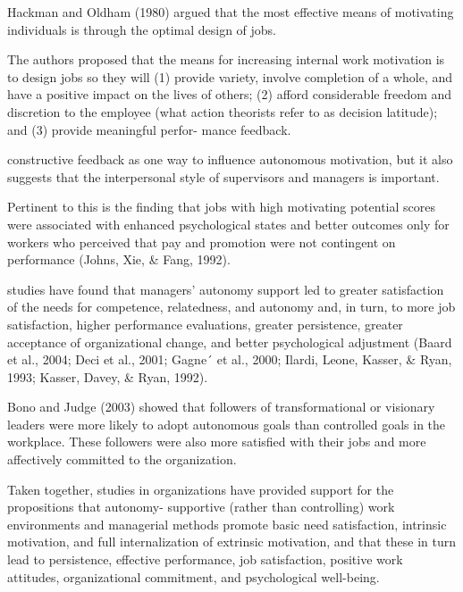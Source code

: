 Hackman and Oldham (1980) argued that the most effective means of motivating individuals is through the optimal design of jobs.

The authors proposed that the means for increasing internal work motivation is to design jobs so they will (1) provide variety, involve completion of a whole, and have a positive impact on the lives of others; (2) afford considerable freedom and discretion to the employee (what action theorists refer to as decision latitude); and (3) provide meaningful perfor-
mance feedback.

constructive feedback as one way to inﬂuence autonomous motivation, but it also suggests that the interpersonal style of supervisors and managers is important.

Pertinent to this is the ﬁnding that jobs with high motivating potential scores were associated with enhanced psychological states and better outcomes only for workers who perceived that pay and promotion were not contingent on performance (Johns, Xie, & Fang, 1992).

studies have found that managers’ autonomy support led to greater satisfaction of the needs for competence, relatedness, and autonomy and, in turn, to more job satisfaction, higher performance evaluations, greater persistence, greater acceptance of organizational change, and better psychological adjustment (Baard et al., 2004; Deci et al., 2001; Gagne´ et al., 2000; Ilardi, Leone, Kasser, & Ryan, 1993; Kasser, Davey, & Ryan, 1992).

Bono and Judge (2003) showed that followers of transformational or visionary leaders were more likely to adopt autonomous goals than controlled goals in the workplace. These followers were also more satisﬁed with their jobs and more affectively committed to the organization.

Taken together, studies in organizations have provided support for the propositions that autonomy-
supportive (rather than controlling) work environments and managerial methods promote basic need satisfaction, intrinsic motivation, and full internalization of extrinsic motivation, and that these in turn lead to persistence, effective performance, job satisfaction, positive work attitudes, organizational commitment, and psychological well-being.


